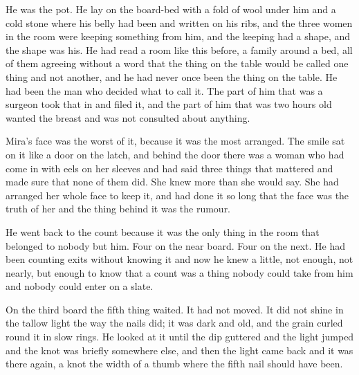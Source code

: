 He was the pot. He lay on the board-bed with a fold of wool under him and a cold stone where his belly had been and  written on his ribs, and the three women in the room were keeping something from him, and the keeping had a shape, and the shape was his. He had read a room like this before, a family around a bed, all of them agreeing without a word that the thing on the table would be called one thing and not another, and he had never once been the thing on the table. He had been the man who decided what to call it. The part of him that was a surgeon took that in and filed it, and the part of him that was two hours old wanted the breast and was not consulted about anything.

Mira's face was the worst of it, because it was the most arranged. The smile sat on it like a door on the latch, and behind the door there was a woman who had come in with eels on her sleeves and had said three things that mattered and made sure that none of them did. She knew more than she would say. She had arranged her whole face to keep it, and had done it so long that the face was the truth of her and the thing behind it was the rumour.

He went back to the count because it was the only thing in the room that belonged to nobody but him. Four on the near board. Four on the next. He had been counting exits without knowing it and now he knew a little, not enough, not nearly, but enough to know that a count was a thing nobody could take from him and nobody could enter on a slate.

On the third board the fifth thing waited. It had not moved. It did not shine in the tallow light the way the nails did; it was dark and old, and the grain curled round it in slow rings. He looked at it until the dip guttered and the light jumped and the knot was briefly somewhere else, and then the light came back and it was there again, a knot the width of a thumb where the fifth nail should have been.
